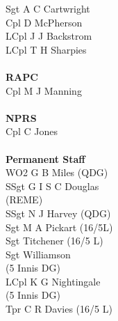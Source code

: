 \begin{multicols}{4}
  Sgt A C Cartwright \\
  Cpl D McPherson \\
  LCpl J J Backstrom \\
  LCpl T H Sharpies \\
  \\
  \textbf{RAPC} \\
  Cpl M J Manning \\
  \\
  \textbf{NPRS} \\
  Cpl C Jones \\
  \\
  \textbf{Permanent Staff} \\
  WO2 G B Miles (QDG) \\
  SSgt G I S C Douglas \\ \indent (REME) \\
  SSgt N J Harvey (QDG) \\
  Sgt M A Pickart (16/5L) \\
  Sgt Titchener (16/5 L) \\
  Sgt Williamson \\ \indent (5 Innis DG) \\
  LCpl K G Nightingale \\ \indent (5 Innis DG) \\
  Tpr C R Davies (16/5 L)
\end{multicols}

\pagebreak
